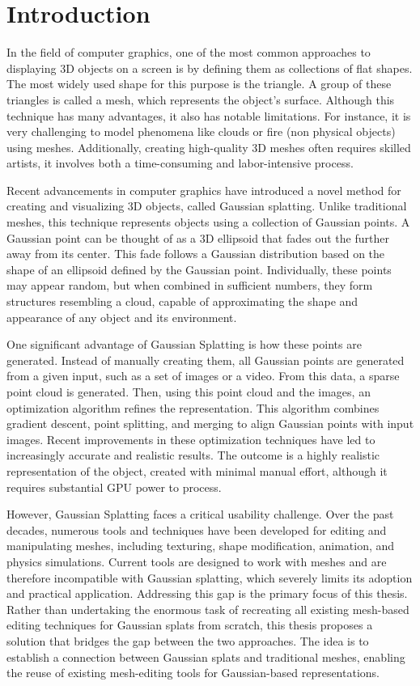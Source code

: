 \chapter{Introduction}

In the field of computer graphics, one of the most common approaches to displaying 3D objects on a screen is by defining them as collections of flat shapes. The most widely used shape for this purpose is the triangle. A group of these triangles is called a mesh, which represents the object's surface. Although this technique has many advantages, it also has notable limitations. For instance, it is very challenging to model phenomena like clouds or fire (non physical objects) using meshes. Additionally, creating high-quality 3D meshes often requires skilled artists, it involves both a time-consuming and labor-intensive process.

Recent advancements in computer graphics have introduced a novel method for creating and visualizing 3D objects, called Gaussian splatting. Unlike traditional meshes, this technique represents objects using a collection of Gaussian points. A Gaussian point can be thought of as a 3D ellipsoid that fades out the further away from its center. This fade follows a Gaussian distribution based on the shape of an ellipsoid defined by the Gaussian point. Individually, these points may appear random, but when combined in sufficient numbers, they form structures resembling a cloud, capable of approximating the shape and appearance of any object and its environment. 

One significant advantage of Gaussian Splatting is how these points are generated. Instead of manually creating them, all Gaussian points are generated from a given input, such as a set of images or a video. From this data, a sparse point cloud is generated. Then, using this point cloud and the images, an optimization algorithm refines the representation. This algorithm combines gradient descent, point splitting, and merging to align Gaussian points with input images. Recent improvements in these optimization techniques have led to increasingly accurate and realistic results. The outcome is a highly realistic representation of the object, created with minimal manual effort, although it requires substantial GPU power to process.

However, Gaussian Splatting faces a critical usability challenge. Over the past decades, numerous tools and techniques have been developed for editing and manipulating meshes, including texturing, shape modification, animation, and physics simulations. Current tools are designed to work with meshes and are therefore incompatible with Gaussian splatting, which severely limits its adoption and practical application. Addressing this gap is the primary focus of this thesis. Rather than undertaking the enormous task of recreating all existing mesh-based editing techniques for Gaussian splats from scratch, this thesis proposes a solution that bridges the gap between the two approaches. The idea is to establish a connection between Gaussian splats and traditional meshes, enabling the reuse of existing mesh-editing tools for Gaussian-based representations.